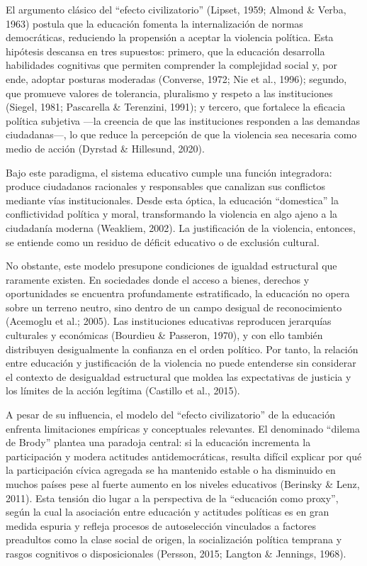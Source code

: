 \documentclass[
  13pt,
]{article}
\begin{document}
El argumento clásico del ``efecto civilizatorio'' (Lipset, 1959; Almond
\& Verba, 1963) postula que la educación fomenta la internalización de
normas democráticas, reduciendo la propensión a aceptar la violencia
política. Esta hipótesis descansa en tres supuestos: primero, que la
educación desarrolla habilidades cognitivas que permiten comprender la
complejidad social y, por ende, adoptar posturas moderadas (Converse,
1972; Nie et al., 1996); segundo, que promueve valores de tolerancia,
pluralismo y respeto a las instituciones (Siegel, 1981; Pascarella \&
Terenzini, 1991); y tercero, que fortalece la eficacia política
subjetiva ---la creencia de que las instituciones responden a las
demandas ciudadanas---, lo que reduce la percepción de que la violencia
sea necesaria como medio de acción (Dyrstad \& Hillesund, 2020).

Bajo este paradigma, el sistema educativo cumple una función
integradora: produce ciudadanos racionales y responsables que canalizan
sus conflictos mediante vías institucionales. Desde esta óptica, la
educación ``domestica'' la conflictividad política y moral,
transformando la violencia en algo ajeno a la ciudadanía moderna
(Weakliem, 2002). La justificación de la violencia, entonces, se
entiende como un residuo de déficit educativo o de exclusión cultural.

No obstante, este modelo presupone condiciones de igualdad estructural
que raramente existen. En sociedades donde el acceso a bienes, derechos
y oportunidades se encuentra profundamente estratificado, la educación
no opera sobre un terreno neutro, sino dentro de un campo desigual de
reconocimiento (Acemoglu et al.; 2005). Las instituciones educativas
reproducen jerarquías culturales y económicas (Bourdieu \& Passeron,
1970), y con ello también distribuyen desigualmente la confianza en el
orden político. Por tanto, la relación entre educación y justificación
de la violencia no puede entenderse sin considerar el contexto de
desigualdad estructural que moldea las expectativas de justicia y los
límites de la acción legítima (Castillo et al., 2015).

A pesar de su influencia, el modelo del ``efecto civilizatorio'' de la
educación enfrenta limitaciones empíricas y conceptuales relevantes. El
denominado ``dilema de Brody'' plantea una paradoja central: si la
educación incrementa la participación y modera actitudes
antidemocráticas, resulta difícil explicar por qué la participación
cívica agregada se ha mantenido estable o ha disminuido en muchos países
pese al fuerte aumento en los niveles educativos (Berinsky \& Lenz,
2011). Esta tensión dio lugar a la perspectiva de la ``educación como
proxy'', según la cual la asociación entre educación y actitudes
políticas es en gran medida espuria y refleja procesos de autoselección
vinculados a factores preadultos como la clase social de origen, la
socialización política temprana y rasgos cognitivos o disposicionales
(Persson, 2015; Langton \& Jennings, 1968).
\end{document}
